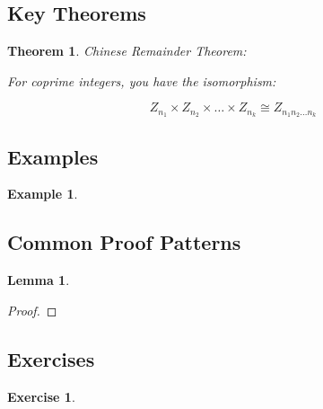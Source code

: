 \documentclass[11pt]{article}
\theoremstyle{definition}
\newtheorem{example}[definition]{Example}
\newtheorem{exercise}[definition]{Exercise}
\theoremstyle{plain}
\newtheorem{theorem}[definition]{Theorem}
\newtheorem{lemma}[definition]{Lemma}
\theoremstyle{remark}
\begin{document}
\subsection{Key Theorems}

\begin{theorem}

Chinese Remainder Theorem:

For coprime integers, you have the isomorphism:

$$Z_{n_1} \times Z_{n_2} \times \dots \times Z_{n_k} \cong Z_{n_1 n_2 \dots n_k}$$

\end{theorem}




\subsection{Examples}

\begin{example}

\end{example}

\subsection{Common Proof Patterns}

\begin{lemma}

\end{lemma}

\begin{proof}

\end{proof}

\subsection{Exercises}

\begin{exercise}

\end{exercise}
\end{document}
